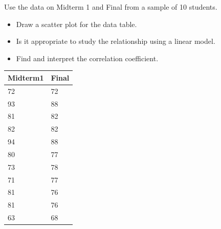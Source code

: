 \begin{example}
  Use the data on Midterm 1 and Final from a sample of 10 students.
  \begin{itemize}
    \item
      Draw a scatter plot for the data table.
    \item
      Is it appropriate to study the relationship using a linear model.
    \item
      Find and interpret the correlation coefficient.
    \end{itemize}
  \begin{table}[h]
        \begin{tabular}[c]{l|l}
          \hline
          \multicolumn{1}{c|}{\textbf{Midterm1}} & 
          \multicolumn{1}{c}{\textbf{Final}} \\
          \hline
          72 & 72\\
          93 & 88\\
          81 & 82\\
          82 & 82\\
          94 & 88\\
          80 & 77\\
          73 & 78\\
          71 & 77\\
          81 & 76\\
          81 & 76\\
          63 & 68\\
          \hline
        \end{tabular}
  \end{table}
\end{example}
\vspace*{\baselineskip}

